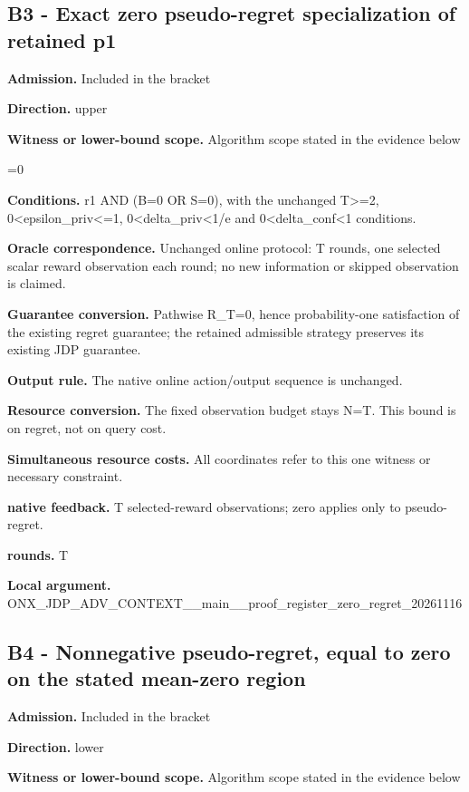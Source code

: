 \documentclass[10pt,a4paper]{article}
\newcommand{\AtlasMath}[1]{\par\begingroup\centering\setbox0=\hbox{$\displaystyle #1$}\ifdim\wd0>1.4\linewidth\typeout{ATLAS WIDE FORMULA: \the\wd0}\fi\ifdim\wd0>\linewidth\resizebox{\linewidth}{!}{\box0}\else\box0\fi\par\endgroup}
\begin{document}
\subsection{B3 - Exact zero pseudo-regret specialization of retained p1}
\textbf{Admission.} Included in the bracket

\textbf{Direction.} upper

\textbf{Witness or lower-bound scope.} Algorithm scope stated in the evidence below

\AtlasMath{0}
\textbf{Conditions.} r1 AND (B=0 OR S=0), with the unchanged T>=2, 0<epsilon\_\allowbreak{}priv<=1, 0<delta\_\allowbreak{}priv<1/e and 0<delta\_\allowbreak{}conf<1 conditions.

\textbf{Oracle correspondence.} Unchanged online protocol: T rounds, one selected scalar reward observation each round; no new information or skipped observation is claimed.

\textbf{Guarantee conversion.} Pathwise R\_\allowbreak{}T=0, hence probability-one satisfaction of the existing regret guarantee; the retained admissible strategy preserves its existing JDP guarantee.

\textbf{Output rule.} The native online action/output sequence is unchanged.

\textbf{Resource conversion.} The fixed observation budget stays N=T. This bound is on regret, not on query cost.

\textbf{Simultaneous resource costs.} All coordinates refer to this one witness or necessary constraint.

\textbf{native feedback.} T selected-reward observations; zero applies only to pseudo-regret.

\textbf{rounds.} T

\textbf{Local argument.} ONX\_\allowbreak{}JDP\_\allowbreak{}ADV\_\allowbreak{}CONTEXT\_\allowbreak{}\_\allowbreak{}main\_\allowbreak{}\_\allowbreak{}proof\_\allowbreak{}register\_\allowbreak{}zero\_\allowbreak{}regret\_\allowbreak{}20261116

\subsection{B4 - Nonnegative pseudo-regret, equal to zero on the stated mean-zero region}
\textbf{Admission.} Included in the bracket

\textbf{Direction.} lower

\textbf{Witness or lower-bound scope.} Algorithm scope stated in the evidence below
\end{document}
